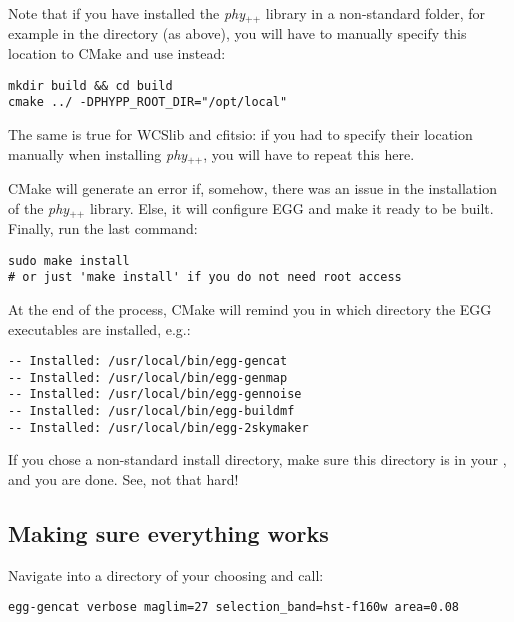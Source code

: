 \documentclass[12pt,a4paper]{article}
\newcommand{\phypp}{\textit{phy}$_{\text{++}}$\xspace}
\newcommand{\egg}{\textsc{EGG}\xspace}
\begin{document}
\begin{enumerate}
Note that if you have installed the \phypp library in a non-standard folder, for example in the  directory (as above), you will have to manually specify this location to CMake and use instead:
\begin{verbatim}
mkdir build && cd build
cmake ../ -DPHYPP_ROOT_DIR="/opt/local"
\end{verbatim}
The same is true for WCSlib and cfitsio: if you had to specify their location manually when installing \phypp, you will have to repeat this here.

CMake will generate an error if, somehow, there was an issue in the installation of the \phypp library. Else, it will configure \egg and make it ready to be built. Finally, run the last command:
\begin{verbatim}
sudo make install
# or just 'make install' if you do not need root access
\end{verbatim}
\end{enumerate}
At the end of the process, CMake will remind you in which directory the \egg executables are installed, e.g.:
\begin{verbatim}
-- Installed: /usr/local/bin/egg-gencat
-- Installed: /usr/local/bin/egg-genmap
-- Installed: /usr/local/bin/egg-gennoise
-- Installed: /usr/local/bin/egg-buildmf
-- Installed: /usr/local/bin/egg-2skymaker
\end{verbatim}
If you chose a non-standard install directory, make sure this directory is in your , and you are done. See, not that hard!

\subsection{Making sure everything works}

Navigate into a directory of your choosing and call:
\begin{verbatim}
egg-gencat verbose maglim=27 selection_band=hst-f160w area=0.08
\end{verbatim}
\end{document}
